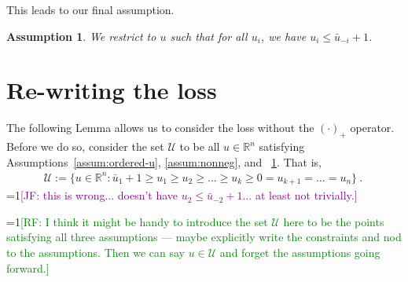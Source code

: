 \documentclass[12pt]{article}
\newcommand{\Comments}{1}
\newcommand{\mynote}[2]{\ifnum\Comments=1\textcolor{#1}{#2}\fi}
\newcommand{\raf}[1]{\mynote{green}{[RF: #1]}}
\newcommand{\jessie}[1]{\mynote{purple}{[JF: #1]}}
\newcommand{\reals}{\mathbb{R}}
\newcommand{\U}{\mathcal{U}}
\newtheorem{assumption}{Assumption}
\begin{document}
This leads to our final assumption.
\begin{assumption}\label{assum:top-threshold}
	We restrict to $u$ such that for all $u_i$, we have $u_i \leq \bar u_{-i} +1$.
\end{assumption}



\section{Re-writing the loss}
The following Lemma allows us to consider the loss without the $(\cdot)_+$ operator.
Before we do so, consider the set $\U$ to be all $u \in \reals^n$ satisfying Assumptions~\ref{assum:ordered-u}, \ref{assum:nonneg}, and ~\ref{assum:top-threshold}.
That is, 
\begin{align*}
\U := \{ u \in \reals^n : \bar u_1 + 1 \geq u_1 \geq u_2 \geq \ldots \geq u_k \geq 0 = u_{k+1} = \ldots = u_n \}~.~
\end{align*}
\jessie{this is wrong... doesn't have $u_2 \leq \bar u_{-2}+1$... at least not trivially.}

\raf{I think it might be handy to introduce the set $\U$ here to be the points satisfying all three assumptions --- maybe explicitly write the constraints and nod to the assumptions.  Then we can say $u\in\U$ and forget the assumptions going forward.}
\end{document}
